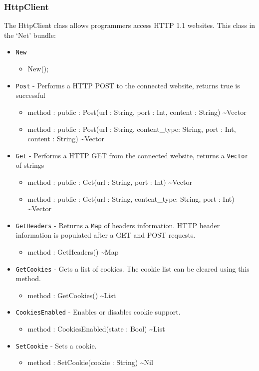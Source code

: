 \documentclass[11pt]{article}
\begin{document}
\subsubsection{HttpClient}
The HttpClient class allows programmers access HTTP 1.1 websites.
This class in the `Net' bundle:
\begin{itemize}
\item \texttt{New}
  \begin{itemize}
  \item New();
  \end{itemize}
  
\item \texttt{Post} - Performs a HTTP POST to the connected website,
  returns true is successful
  \begin{itemize}
  \item method : public : Post(url : String, port : Int, content : String) \textasciitilde Vector
  \item method : public : Post(url : String, content\_type: String,
    port : Int, content : String) \textasciitilde Vector
  \end{itemize}

\item \texttt{Get} - Performs a HTTP GET from the connected website,
  returns a \texttt{Vector} of strings
  \begin{itemize}
  \item method : public : Get(url : String, port : Int) \textasciitilde Vector
  \item method : public : Get(url : String, content\_type: String, port : Int) \textasciitilde Vector
  \end{itemize}

\item \texttt{GetHeaders} - Returns a \texttt{Map} of headers
  information.  HTTP header information is populated after a GET and POST
  requests.
  \begin{itemize}
  \item method : GetHeaders() \textasciitilde Map
  \end{itemize}
\item \texttt{GetCookies} - Gets a list of cookies.  The cookie list
  can be cleared using this method.
  \begin{itemize}
  \item method : GetCookies() \textasciitilde List
  \end{itemize}
\item \texttt{CookiesEnabled} - Enables or disables cookie support.
  \begin{itemize}
  \item method : CookiesEnabled(state : Bool) \textasciitilde List
  \end{itemize}
\item \texttt{SetCookie} - Sets a cookie.
  \begin{itemize}
  \item method : SetCookie(cookie : String) \textasciitilde Nil
  \end{itemize}
\end{itemize}
\end{document}
